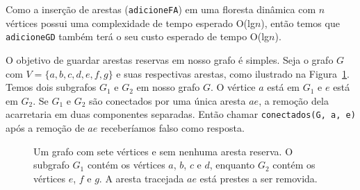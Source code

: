 Como a inserção de arestas (\texttt{adicioneFA}) em uma floresta dinâmica com $n$ vértices possui uma complexidade de tempo esperado O(lg$n$), então temos que \texttt{adicioneGD} também terá o seu custo esperado de tempo O(lg$n$). 

O objetivo de guardar arestas reservas em nosso grafo é simples. Seja o grafo $G$ com $V = \{a, b, c, d, e, f, g\}$ e suas respectivas arestas, como ilustrado na Figura~\ref{fig:graph_without_reserve_edges}. Temos dois subgrafos $G_1$ e $G_2$ em nosso grafo $G$. O vértice $a$ está em $G_1$ e $e$ está em $G_2$. Se $G_1$ e $G_2$ são conectados por uma única aresta $ae$, a remoção dela acarretaria em duas componentes separadas. Então chamar \texttt{conectados(G, a, e)} após a remoção de $ae$ receberíamos falso como resposta. 

\begin{figure}
    \centering
    \caption{Um grafo com sete vértices e sem nenhuma aresta reserva. O subgrafo $G_1$ contém os vértices $a$, $b$, $c$ e $d$, enquanto $G_2$ contém os vértices $e$, $f$ e $g$. A aresta tracejada $ae$ está prestes a ser removida.}
    \label{fig:graph_without_reserve_edges}
\end{figure}

